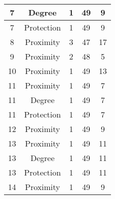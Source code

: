 \documentclass[results.tex]{subfiles}
\begin{document}
\begin{center}
\begin{tabular}{| c || c | c | c | c |}
            \hline
            7                       & Degree                       & 1                      & 49                      & 9                    \\
            \hline
            7                       & Protection                   & 1                      & 49                      & 9                    \\
            \hline
            8                       & Proximity                    & 3                      & 47                      & 17                   \\
            \hline
            9                       & Proximity                    & 2                      & 48                      & 5                    \\
            \hline
            10                      & Proximity                    & 1                      & 49                      & 13                   \\
            \hline
            11                      & Proximity                    & 1                      & 49                      & 7                    \\
            \hline
            11                      & Degree                       & 1                      & 49                      & 7                    \\
            \hline
            11                      & Protection                   & 1                      & 49                      & 7                    \\
            \hline
            12                      & Proximity                    & 1                      & 49                      & 9                    \\
            \hline
            13                      & Proximity                    & 1                      & 49                      & 11                   \\
            \hline
            13                      & Degree                       & 1                      & 49                      & 11                   \\
            \hline
            13                      & Protection                   & 1                      & 49                      & 11                   \\
            \hline
            14                      & Proximity                    & 1                      & 49                      & 9                    \\

\end{tabular}
\end{center}
\end{document}
